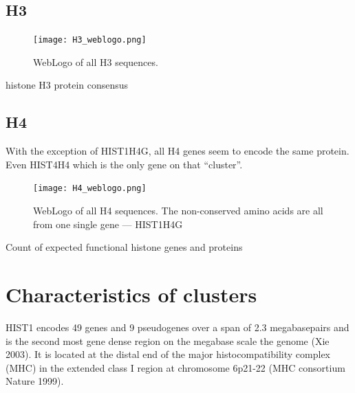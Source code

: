 \documentclass[10pt,a4paper,draft]{article}
\newcommand{\rewrite}[2][]{\todo[inline,color=green!40,#1]{#2}}       %
\begin{document}
    \subsection{H3}
      \begin{figure}
        \centering
        \texttt{[image: H3\_weblogo.png]}
        \caption{WebLogo of all H3 sequences.}
        \label{fig:h3-weblogo}
      \end{figure}
      \begin{table}
        \centering
        
        \caption{histone H3 protein consensus}
        \label{tab:H3-consensus}
      \end{table}

    \subsection{H4}
      With the exception of HIST1H4G, all H4 genes seem to encode the same protein. Even HIST4H4 which is the
      only gene on that ``cluster''.
      \begin{figure}
        \centering
        \texttt{[image: H4\_weblogo.png]}
        \caption{WebLogo of all H4 sequences. The non-conserved amino acids are all from one single gene --- HIST1H4G}
        \label{fig:h4-weblogo}
      \end{figure}

      \begin{table}
        \centering
        
        \caption{Count of expected functional histone genes and proteins}
        \label{tab:H4-consensus}
      \end{table}



  \section{Characteristics of clusters}
    HIST1 encodes 49 genes and 9 pseudogenes over a span of 2.3 megabasepairs and is the second
    most gene dense region on the megabase scale the genome (Xie 2003). It is located at the distal
    end of the major histocompatibility complex (MHC) in the extended class I region at chromosome
    6p21-22 (MHC consortium Nature 1999).
\end{document}
